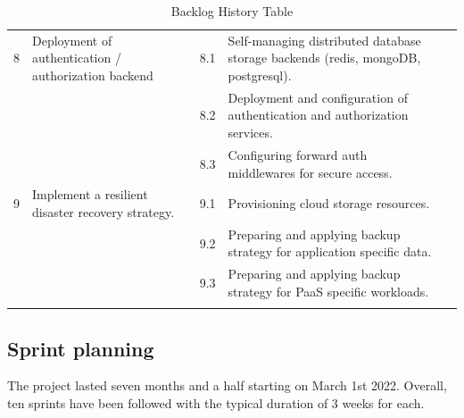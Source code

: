 \begin{longtable}[H]{|m{1cm}|m{3cm}|m{1cm}|m{7cm}|m{1.2cm}|}
8 & \raggedright Deployment of authentication / authorization backend 	& 8.1 & \raggedright Self-managing distributed database storage backends (redis, mongoDB, postgresql).	 & \\
\cline{3-5}
&   & 8.2 &	\raggedright Deployment and configuration of authentication and authorization services.	 & \\
\cline{3-5}
&   & 8.3 &	\raggedright Configuring forward auth middlewares for secure access.	 & \\
   \hline
9 & \raggedright Implement a resilient disaster recovery strategy. & 9.1 &\raggedright  Provisioning cloud storage resources.		 & \\
\cline{3-5}
&   & 9.2 & \raggedright Preparing and applying backup strategy for application specific data.	 & \\
\cline{3-5}
&   & 9.3 &	\raggedright Preparing and applying backup strategy for PaaS specific workloads.	 & \\
 \hline
\caption{ Backlog History Table }
\end{longtable}


\newpage
\subsection{Sprint planning }
The project lasted seven months and a half starting on March 1st 2022. Overall, ten sprints have been followed with the typical duration of 3 weeks for each. 


